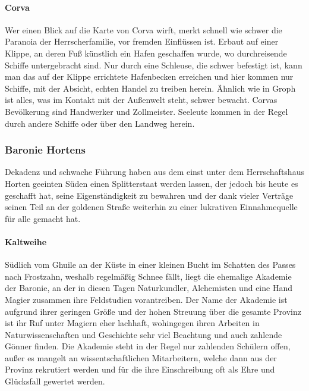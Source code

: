 \documentclass[a4paper,12pt,oneside]{book}
\begin{document}
\paragraph{Corva}
Wer einen Blick auf die Karte von Corva wirft, merkt schnell wie schwer die Paranoia der Herrscherfamilie, vor fremden Einflüssen ist. Erbaut auf einer Klippe, an deren Fuß künstlich ein Hafen geschaffen wurde, wo durchreisende Schiffe untergebracht sind. Nur durch eine Schleuse, die schwer befestigt ist, kann man das auf der Klippe errichtete Hafenbecken erreichen und hier kommen nur Schiffe, mit der Absicht, echten Handel zu treiben herein. Ähnlich wie in Groph ist alles, was im Kontakt mit der Außenwelt steht, schwer bewacht. Corvas Bevölkerung sind Handwerker und Zollmeister. Seeleute kommen in der Regel durch andere Schiffe oder über den Landweg herein.

\subsubsection{Baronie Hortens}
Dekadenz und schwache Führung haben aus dem einst unter dem Herrschaftshaus Horten geeinten Süden einen Splitterstaat werden lassen, der jedoch bis heute es geschafft hat, seine Eigenständigkeit zu bewahren und der dank vieler Verträge seinen Teil an der goldenen Straße weiterhin zu einer lukrativen Einnahmequelle für alle gemacht hat. 
\paragraph{Kaltweihe}
Südlich vom Ghuile an der Küste in einer kleinen Bucht im Schatten des Passes nach Frostzahn, weshalb regelmäßig Schnee fällt, liegt die ehemalige Akademie der Baronie, an der in diesen Tagen Naturkundler, Alchemisten und eine Hand Magier zusammen ihre Feldstudien vorantreiben. Der Name der Akademie ist aufgrund ihrer geringen Größe und der hohen Streuung über die gesamte Provinz ist ihr Ruf unter Magiern eher lachhaft, wohingegen ihren Arbeiten in Naturwissenschaften und Geschichte sehr viel Beachtung und auch zahlende Gönner finden. Die Akademie steht in der Regel nur zahlenden Schülern offen, außer es mangelt an wissentschaftlichen Mitarbeitern, welche dann aus der Provinz rekrutiert werden und für die ihre Einschreibung oft als Ehre und Glücksfall gewertet werden.
\end{document}
